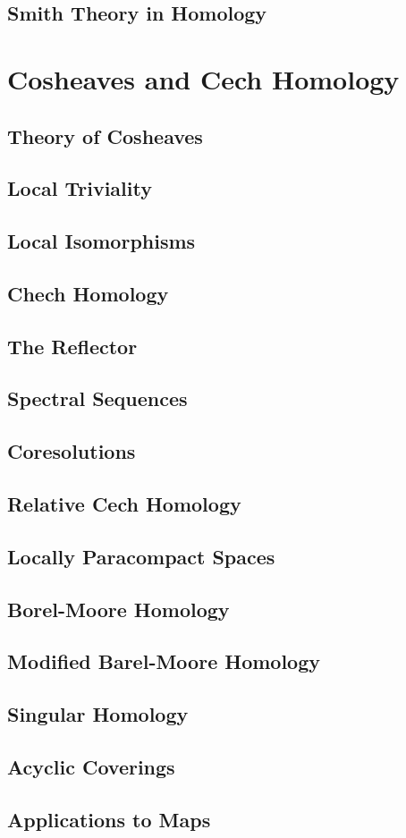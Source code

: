 \subsection{Smith Theory in Homology}

\section{Cosheaves and Cech Homology}
\subsection{Theory of Cosheaves}
\subsection{Local Triviality}
\subsection{Local Isomorphisms}
\subsection{Chech Homology}
\subsection{The Reflector}
\subsection{Spectral Sequences}
\subsection{Coresolutions}
\subsection{Relative Cech Homology}
\subsection{Locally Paracompact Spaces}
\subsection{Borel-Moore Homology}
\subsection{Modified Barel-Moore Homology}
\subsection{Singular Homology}
\subsection{Acyclic Coverings}
\subsection{Applications to Maps}
